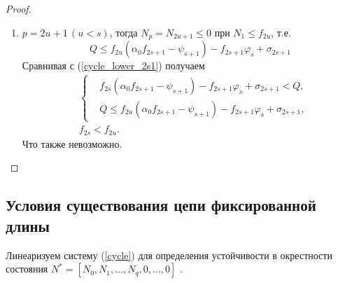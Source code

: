 \begin{proof}
\begin{enumerate}
\begin{enumerate}
                \item \(p = 2u+1 \, (u < s)\), тогда \( N_p = N_{2u+1} \leq 0 \) при \(N_1 \leq f_{2u} \), т.е. 
                \begin{equation*}
                    Q \leq f_{2u} ( \alpha_0 f_{2s+1} - \psi_{s+1} ) - f_{2s+1} \varphi_s + \sigma_{2s+1}
                \end{equation*}
                Сравнивая с (\ref{cycle_lower_2s1}) получаем
                \begin{equation*}
                    \begin{split}
                    & \left\{ \begin{split}
                        & f_{2s} ( \alpha_0 f_{2s+1}  - \psi_{s+1} ) - f_{2s+1} \varphi_s + \sigma_{2s+1}
                        < Q, \\
                        & Q \leq f_{2u} ( \alpha_0 f_{2s+1} - \psi_{s+1} ) - f_{2s+1} \varphi_s + \sigma_{2s+1},
                    \end{split} \right. \\
                    & f_{2s} < f_{2u}.
                    \end{split}
                \end{equation*}
                Что также невозможно. 
            \end{enumerate}
        \end{enumerate}
    \end{proof}

\subsection{Условия существования цепи фиксированной длины}

    Линеаризуем систему (\ref{cycle}) для определения устойчивости в окрестности состояния \(N^* = [ N_0, N_1, \dots, N_q, 0, \dots, 0 ]\) .

